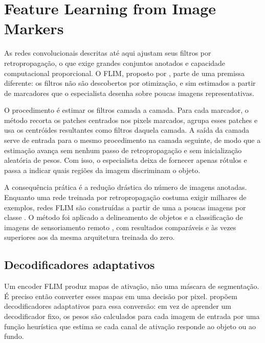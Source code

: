 

\section{Feature Learning from Image Markers}

As redes convolucionais descritas até aqui ajustam seus filtros por retropropagação, o que exige grandes conjuntos anotados e capacidade computacional proporcional. O \ac{FLIM}, proposto por \cite{souza2020flim}, parte de uma premissa diferente: os filtros não são descobertos por otimização, e sim estimados a partir de marcadores que o especialista desenha sobre poucas imagens representativas.

O procedimento é estimar os filtros camada a camada. Para cada marcador, o método recorta os patches centrados nos pixels marcados, agrupa esses patches e usa os centróides resultantes como filtros daquela camada. A saída da camada serve de entrada para o mesmo procedimento na camada seguinte, de modo que a estimação avança sem nenhum passo de retropropagação e sem inicialização aleatória de pesos. Com isso, o especialista deixa de fornecer apenas rótulos e passa a indicar quais regiões da imagem discriminam o objeto.

A consequência prática é a redução drástica do número de imagens anotadas. Enquanto uma rede treinada por retropropagação costuma exigir milhares de exemplos, redes \ac{FLIM} são construídas a partir de uma a poucas imagens por classe \cite{benato2020cnnmarkers}. O método foi aplicado a delineamento de objetos \cite{souza2020flim} e a classificação de imagens de sensoriamento remoto \cite{souza2020coconut}, com resultados comparáveis e às vezes superiores aos da mesma arquitetura treinada do zero.

\subsection{Decodificadores adaptativos}

Um encoder \ac{FLIM} produz mapas de ativação, não uma máscara de segmentação. É preciso então converter esses mapas em uma decisão por pixel. \cite{soares2026flim} propõem decodificadores adaptativos para essa conversão: em vez de aprender um decodificador fixo, os pesos são calculados para cada imagem de entrada por uma função heurística que estima se cada canal de ativação responde ao objeto ou ao fundo.

